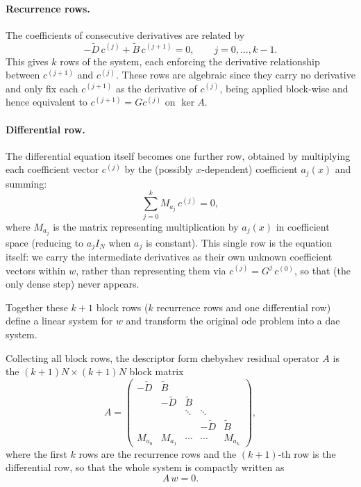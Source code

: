 \paragraph{Recurrence rows.} The coefficients of consecutive derivatives are related by
\begin{equation}
  -\tilde D\, c^{(j)} + \tilde B\, c^{(j+1)} = 0, \qquad j = 0, \dots, k-1.
  \label{eq:descriptor-recurrence-rows}
\end{equation}
This gives $k$ rows of the system, each enforcing the derivative relationship between $c^{(j+1)}$ and $c^{(j)}$. These rows are algebraic since they carry no derivative and only fix each $c^{(j+1)}$ as the derivative of $c^{(j)}$, being  applied block-wise and hence equivalent to $c^{(j+1)} = G c^{(j)}$ on $\ker A$.

\paragraph{Differential row.} The differential equation itself becomes one
further row, obtained by multiplying each coefficient vector $c^{(j)}$ by
the (possibly $x$-dependent) coefficient $a_j(x)$ and summing:
\begin{equation}
  \sum_{j=0}^{k} M_{a_j}\, c^{(j)} = 0,
  \label{eq:descriptor-ode-row}
\end{equation}
where $M_{a_j}$ is the matrix representing multiplication by $a_j(x)$ in
coefficient space (reducing to $a_j I_N$ when $a_j$ is constant). This single row is the equation itself: we carry the intermediate derivatives as their own unknown coefficient vectors within $w$, rather than representing them via $c^{(j)} = G^j\,c^{(0)}$, so that  (the only dense step) never appears.

Together these $k+1$ block rows ($k$ recurrence rows and one
differential row) define a linear system for $w$ and transform the original \gls{ode} problem into a \gls{dae} system.

\begin{definition}
\label{def:descriptor-residual-operator}
Collecting all block rows, the descriptor form chebyshev residual operator
$A$ is the $(k+1)N \times (k+1)N$ block matrix
\begin{equation}
A =
\begin{pmatrix}
-\tilde D & \tilde B &        &        &          \\
          & -\tilde D & \tilde B &      &          \\
          &          & \ddots & \ddots &          \\
          &          &        & -\tilde D & \tilde B \\
M_{a_0}   & M_{a_1}  & \cdots & \cdots & M_{a_k}
\end{pmatrix},
\end{equation}
where the first $k$ rows are the recurrence rows and the $(k+1)$-th row is
the differential row, so that the whole system is compactly written as
\begin{equation}
  A\, w = 0.
\end{equation}
\end{definition}

